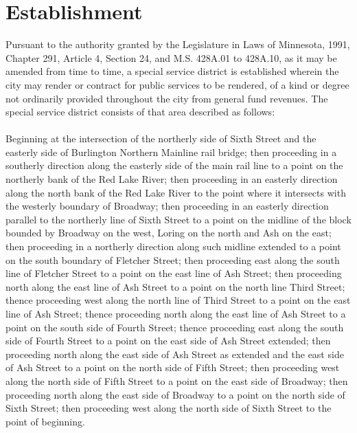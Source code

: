 
\setcounter{section}{14}
\section{Establishment}
Pursuant to the authority granted by the Legislature in Laws of Minnesota, 1991, Chapter 291, Article 4, Section 24, and M.S. \textsection 428A.01 to \textsection 428A.10, as it may be amended from time to time, a special service district is established wherein the city may render or contract for public services to be rendered, of a kind or degree not ordinarily provided throughout the city from general fund revenues. The special service district consists of that area described as follows:\\
\\
Beginning at the intersection of the northerly side of Sixth Street and the easterly side of Burlington Northern Mainline rail bridge; then proceeding in a southerly direction along the easterly side of the main rail line to a point on the northerly bank of the Red Lake River; then proceeding in an easterly direction along the north bank of the Red Lake River to the point where it intersects with the westerly boundary of Broadway; then proceeding in an easterly direction parallel to the northerly line of Sixth Street to a point on the midline of the block bounded by Broadway on the west, Loring on the north and Ash on the east; then proceeding in a northerly direction along such midline extended to a point on the south boundary of Fletcher Street; then proceeding east along the south line of Fletcher Street to a point on the east line of Ash Street; then proceeding north along the east line of Ash Street to a point on the north line Third Street; thence proceeding west along the north line of Third Street to a point on the east line of Ash Street; thence proceeding north along the east line of Ash Street to a point on the south side of Fourth Street; thence proceeding east along the south side of Fourth Street to a point on the east side of Ash Street extended; then proceeding north along the east side of Ash Street as extended and the east side of Ash Street to a point on the north side of Fifth Street; then proceeding west along the north side of Fifth Street to a point on the east side of Broadway; then proceeding north along the east side of Broadway to a point on the north side of Sixth Street; then proceeding west along the north side of Sixth Street to the point of beginning.


